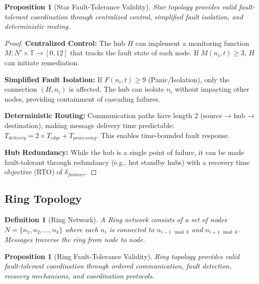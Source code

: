\documentclass{article}
\newtheorem{proposition}[theorem]{Proposition}
\newtheorem{definition}{Definition}
\begin{document}
\begin{proposition}[Star Fault-Tolerance Validity]
Star topology provides valid fault-tolerant coordination through centralized control, simplified fault isolation, and deterministic routing.
\end{proposition}

\begin{proof}
\textbf{Centralized Control:} The hub $H$ can implement a monitoring function $M: N' \times \mathbb{T} \rightarrow [0, 12]$ that tracks the fault state of each node. If $M(n_i, t) \geq 3$, $H$ can initiate remediation.

\textbf{Simplified Fault Isolation:} If $F(n_i, t) \geq 9$ (Panic/Isolation), only the connection $(H, n_i)$ is affected. The hub can isolate $n_i$ without impacting other nodes, providing containment of cascading failures.

\textbf{Deterministic Routing:} Communication paths have length 2 (source → hub → destination), making message delivery time predictable: $T_{delivery} = 2 \times T_{edge} + T_{processing}$. This enables time-bounded fault response.

\textbf{Hub Redundancy:} While the hub is a single point of failure, it can be made fault-tolerant through redundancy (e.g., hot standby hubs) with a recovery time objective (RTO) of $\delta_{failover}$.
\end{proof}

\subsection{Ring Topology}

\begin{definition}[Ring Network]
A Ring network consists of a set of nodes $N = \{n_1, n_2, \ldots, n_k\}$ where each $n_i$ is connected to $n_{i-1 \mod k}$ and $n_{i+1 \mod k}$. Messages traverse the ring from node to node.
\end{definition}

\begin{proposition}[Ring Fault-Tolerance Validity]
Ring topology provides valid fault-tolerant coordination through ordered communication, fault detection, recovery mechanisms, and coordination protocols.
\end{proposition}
\end{document}
